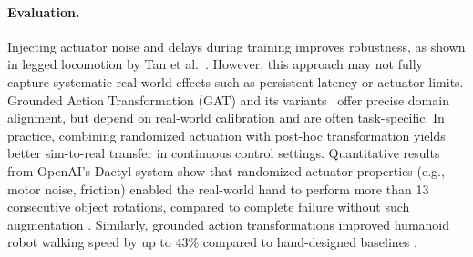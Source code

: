 \paragraph{Evaluation.} Injecting actuator noise and delays during training improves robustness, as shown in legged locomotion by Tan et al.~\cite{Tan2018}. However, this approach may not fully capture systematic real-world effects such as persistent latency or actuator limits. Grounded Action Transformation (GAT) and its variants~\cite{Hanna2017, Desai2020} offer precise domain alignment, but depend on real-world calibration and are often task-specific. In practice, combining randomized actuation with post-hoc transformation yields better sim-to-real transfer in continuous control settings. Quantitative results from OpenAI's Dactyl system show that randomized actuator properties (e.g., motor noise, friction) enabled the real-world hand to perform more than 13 consecutive object rotations, compared to complete failure without such augmentation \cite{Akkaya2019}. Similarly, grounded action transformations improved humanoid robot walking speed by up to 43\% compared to hand-designed baselines \cite{Hanna2017}.